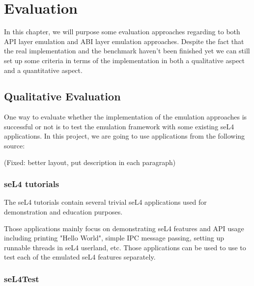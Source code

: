 \chapter{Evaluation}\label{ch:eval}

In this chapter, we will purpose some evaluation approaches regarding to both API layer emulation and ABI layer emulation approaches. Despite the fact that the real implementation and the benchmark haven't been finished yet we can still set up some criteria in terms of the implementation in both a qualitative aspect and a quantitative aspect. 

\section{Qualitative Evaluation} 

One way to evaluate whether the implementation of the emulation approaches is successful or not is to test the emulation framework with some existing seL4 applications. In this project, we are going to use applications from the following source:

(Fixed: better layout, put description in each paragraph)


\subsection{seL4 tutorials}

The seL4 tutorials contain several trivial seL4 applications used for demonstration and education purposes.

Those applications mainly focus on demonstrating seL4 features and API usage including printing "Hello World", simple IPC message passing, setting up runnable threads in seL4 userland, etc. Those applications can be used to use to test each of the emulated seL4 features separately.

\subsection{seL4Test}

